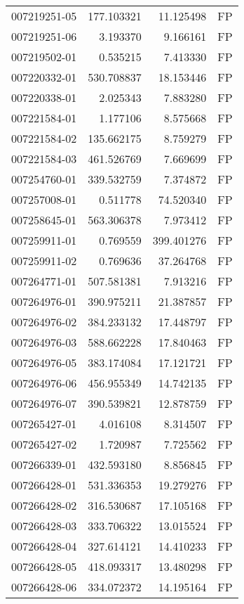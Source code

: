 \begin{tabular}{lrrl}
007219251-05 &  177.103321 &    11.125498 &   FP \\
007219251-06 &    3.193370 &     9.166161 &   FP \\
007219502-01 &    0.535215 &     7.413330 &   FP \\
007220332-01 &  530.708837 &    18.153446 &   FP \\
007220338-01 &    2.025343 &     7.883280 &   FP \\
007221584-01 &    1.177106 &     8.575668 &   FP \\
007221584-02 &  135.662175 &     8.759279 &   FP \\
007221584-03 &  461.526769 &     7.669699 &   FP \\
007254760-01 &  339.532759 &     7.374872 &   FP \\
007257008-01 &    0.511778 &    74.520340 &   FP \\
007258645-01 &  563.306378 &     7.973412 &   FP \\
007259911-01 &    0.769559 &   399.401276 &   FP \\
007259911-02 &    0.769636 &    37.264768 &   FP \\
007264771-01 &  507.581381 &     7.913216 &   FP \\
007264976-01 &  390.975211 &    21.387857 &   FP \\
007264976-02 &  384.233132 &    17.448797 &   FP \\
007264976-03 &  588.662228 &    17.840463 &   FP \\
007264976-05 &  383.174084 &    17.121721 &   FP \\
007264976-06 &  456.955349 &    14.742135 &   FP \\
007264976-07 &  390.539821 &    12.878759 &   FP \\
007265427-01 &    4.016108 &     8.314507 &   FP \\
007265427-02 &    1.720987 &     7.725562 &   FP \\
007266339-01 &  432.593180 &     8.856845 &   FP \\
007266428-01 &  531.336353 &    19.279276 &   FP \\
007266428-02 &  316.530687 &    17.105168 &   FP \\
007266428-03 &  333.706322 &    13.015524 &   FP \\
007266428-04 &  327.614121 &    14.410233 &   FP \\
007266428-05 &  418.093317 &    13.480298 &   FP \\
007266428-06 &  334.072372 &    14.195164 &   FP \\

\end{tabular}
